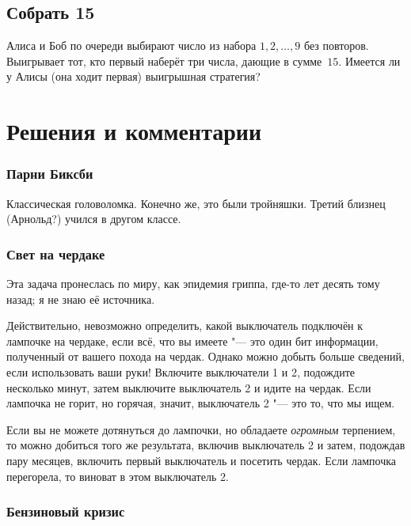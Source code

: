 \documentclass[twoside]{book}
\makeatletter
\newcommand{\rindex}[2][\imki@jobname]{%
  \index[#1]{\detokenize{#2}}%
}
\makeatother
\begin{document}
 
\subsection*{Собрать 15} %
\rindex{Собрать 15}

Алиса и Боб по очереди выбирают число из набора $1, 2,\dots,9$ без повторов.
Выигрывает тот, кто первый наберёт три числа, дающие в сумме~$15$.
Имеется ли у Алисы (она ходит первая)
выигрышная стратегия?

 

\section*{Решения и комментарии}

\subsubsection*{Парни Биксби} %

Классическая головоломка.
Конечно же, это были тройняшки.
Третий близнец (Арнольд?) учился в другом классе.

\subsubsection*{Свет на чердаке} %

Эта задача пронеслась по миру, как эпидемия гриппа, где-то лет десять тому назад;
я не знаю её источника.

\medskip

Действительно, невозможно определить, какой выключатель подключён к лампочке на чердаке, если всё, что вы имеете "--- это один бит информации, полученный от вашего похода на чердак.
Однако можно добыть больше сведений, если использовать ваши руки!
Включите выключатели 1 и 2, подождите несколько минут, затем выключите выключатель 2 и идите на чердак.
Если лампочка не горит, но горячая, значит, выключатель 2 "--- это то, что мы ищем.
\heart

Если вы не можете дотянуться до лампочки, но обладаете \emph{огромным} терпением, то можно добиться того же результата, включив  выключатель 2 и затем, подождав пару месяцев, включить первый выключатель и посетить чердак.
Если лампочка перегорела, то виноват в этом выключатель 2.

\subsubsection*{Бензиновый кризис} %
\end{document}
